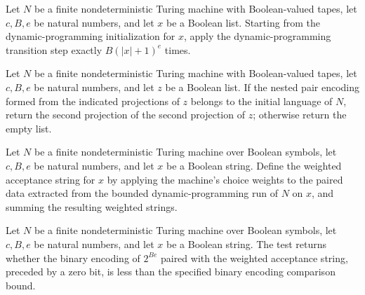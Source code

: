 \begin{definition}
\label{Randomized.BPLInP.dpRun}
\leanok
{}
Let $N$ be a finite nondeterministic Turing machine with Boolean-valued tapes, let
$c,B,e$ be natural numbers, and let $x$ be a Boolean list. Starting from the
dynamic-programming initialization for $x$, apply the dynamic-programming transition
step exactly $B(|x|+1)^e$ times.
\end{definition}

\begin{definition}
\label{Randomized.BPLInP.pickW}
\leanok
{}
Let $N$ be a finite nondeterministic Turing machine with Boolean-valued tapes, let
$c,B,e$ be natural numbers, and let $z$ be a Boolean list. If the nested pair encoding
formed from the indicated projections of $z$ belongs to the initial language of $N$,
return the second projection of the second projection of $z$; otherwise return the empty
list.
\end{definition}

\begin{definition}
\label{Randomized.BPLInP.accW}
\leanok
{}
Let $N$ be a finite nondeterministic Turing machine over Boolean symbols, let $c,B,e$ be
natural numbers, and let $x$ be a Boolean string. Define the weighted acceptance string
for $x$ by applying the machine’s choice weights to the paired data extracted from the
bounded dynamic-programming run of $N$ on $x$, and summing the resulting weighted
strings.
\end{definition}

\begin{definition}
\label{Randomized.BPLInP.bplTest}
\leanok
{}
Let $N$ be a finite nondeterministic Turing machine over Boolean symbols, let $c,B,e$ be
natural numbers, and let $x$ be a Boolean string. The test returns whether the binary
encoding of $2^{Be}$ paired with the weighted acceptance string, preceded by a zero bit,
is less than the specified binary encoding comparison bound.
\end{definition}

